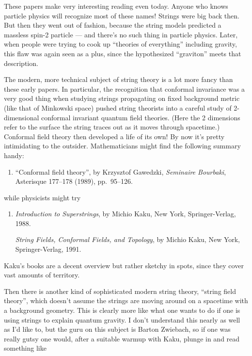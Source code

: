 \documentclass{article}
\def\tightlist{}
\begin{document}
These papers make very interesting reading even today. Anyone who knows
particle physics will recognize most of these names! Strings were big
back then. But then they went out of fashion, because the string models
predicted a massless spin-2 particle --- and there's no such thing in
particle physics. Later, when people were trying to cook up ``theories
of everything'' including gravity, this flaw was again seen as a plus,
since the hypothesized ``graviton'' meets that description.

The modern, more technical subject of string theory is a lot more fancy
than these early papers. In particular, the recognition that conformal
invariance was a very good thing when studying strings propagating on
fixed background metric (like that of Minkowski space) pushed string
theorists into a careful study of 2-dimensional conformal invariant
quantum field theories. (Here the 2 dimensions refer to the surface the
string traces out as it moves through spacetime.) Conformal field theory
then developed a life of its own! By now it's pretty intimidating to the
outsider. Mathematicians might find the following summary handy:

\begin{enumerate}
\def\labelenumi{\arabic{enumi})}
\setcounter{enumi}{1}
\tightlist
\item
  ``Conformal field theory'', by Krzysztof Gawedzki, \emph{Seminaire
  Bourbaki}, Asterisque 177--178 (1989), pp.~95--126.
\end{enumerate}

while physicists might try

\begin{enumerate}
\def\labelenumi{\arabic{enumi})}
\setcounter{enumi}{2}
\item
  \emph{Introduction to Superstrings}, by Michio Kaku, New York,
  Springer-Verlag, 1988.

  \emph{String Fields, Conformal Fields, and Topology}, by Michio Kaku,
  New York, Springer-Verlag, 1991.
\end{enumerate}

Kaku's books are a decent overview but rather sketchy in spots, since
they cover vast amounts of territory.

Then there is another kind of sophisticated modern string theory,
``string field theory'', which doesn't assume the strings are moving
around on a spacetime with a background geometry. This is clearly more
like what one wants to do if one is using strings to explain quantum
gravity. I don't understand this nearly as well as I'd like to, but the
guru on this subject is Barton Zwiebach, so if one was really gutsy one
would, after a suitable warmup with Kaku, plunge in and read something
like
\end{document}

